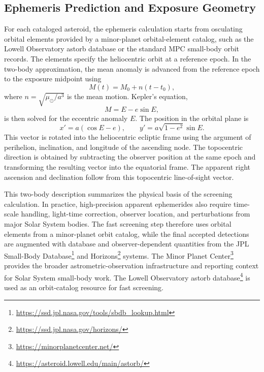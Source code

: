 \documentclass[referee]{raa}
\begin{document}
\FloatBarrier

\subsection{Ephemeris Prediction and Exposure Geometry}

For each cataloged asteroid, the ephemeris calculation starts from osculating orbital elements provided by a minor-planet orbital-element catalog, such as the Lowell Observatory astorb database or the standard MPC small-body orbit records. The elements specify the heliocentric orbit at a reference epoch. In the two-body approximation, the mean anomaly is advanced from the reference epoch to the exposure midpoint using
\begin{equation}
M(t)=M_0+n(t-t_0),
\end{equation}
where \(n=\sqrt{\mu_{\odot}/a^3}\) is the mean motion. Kepler's equation,
\begin{equation}
M=E-e\sin E,
\end{equation}
is then solved for the eccentric anomaly \(E\). The position in the orbital plane is
\begin{equation}
x'=a(\cos E-e), \qquad
y'=a\sqrt{1-e^2}\sin E .
\end{equation}
This vector is rotated into the heliocentric ecliptic frame using the argument of perihelion, inclination, and longitude of the ascending node. The topocentric direction is obtained by subtracting the observer position at the same epoch and transforming the resulting vector into the equatorial frame. The apparent right ascension and declination follow from this topocentric line-of-sight vector.

This two-body description summarizes the physical basis of the screening calculation. In practice, high-precision apparent ephemerides also require time-scale handling, light-time correction, observer location, and perturbations from major Solar System bodies. The fast screening step therefore uses orbital elements from a minor-planet orbit catalog, while the final accepted detections are augmented with database and observer-dependent quantities from the JPL Small-Body Database\footnote{\url{https://ssd.jpl.nasa.gov/tools/sbdb_lookup.html}} and Horizons\footnote{\url{https://ssd.jpl.nasa.gov/horizons/}} systems. The Minor Planet Center\footnote{\url{https://minorplanetcenter.net/}} provides the broader astrometric-observation infrastructure and reporting context for Solar System small-body work. The Lowell Observatory astorb database\footnote{\url{https://asteroid.lowell.edu/main/astorb/}} is used as an orbit-catalog resource for fast screening.
\end{document}

